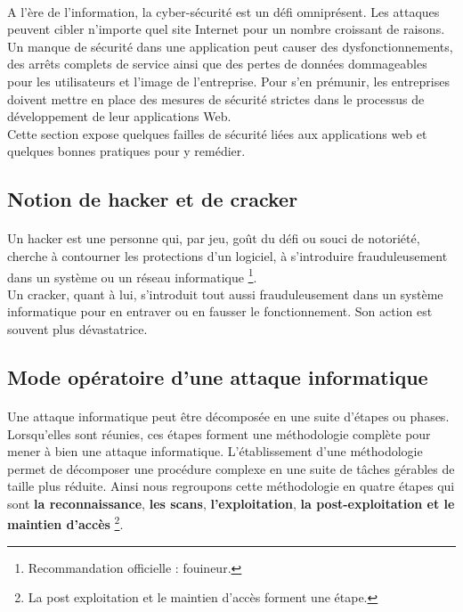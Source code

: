 \paragraph{}
	  A l'\`ere de l'information, la cyber-sécurité est un défi omniprésent. Les attaques peuvent cibler n'importe quel site Internet pour un nombre croissant de raisons. Un manque de sécurité dans une application peut causer des dysfonctionnements, des arrêts complets de service ainsi que des pertes de données dommageables pour les utilisateurs et l'image de l'entreprise. Pour s'en prémunir, les entreprises doivent mettre en place des mesures de sécurité strictes dans le processus de développement de leur applications Web. \\
	  Cette section expose quelques failles de s\'ecurit\'e li\'ees aux applications web et quelques bonnes pratiques pour y rem\'edier.
	  
	\subsection{Notion de hacker et de cracker}
	  \paragraph{}
	    Un hacker est une personne qui, par jeu, goût du défi ou souci de notoriété, cherche à contourner les protections d'un logiciel, à s'introduire frauduleusement dans un système ou un réseau informatique \cite{A} \footnote{Recommandation officielle : fouineur.}.\\Un cracker, quant à lui, s’introduit tout aussi frauduleusement dans un système informatique pour en entraver ou en fausser le fonctionnement. Son action est souvent plus dévastatrice.
		

	\subsection{Mode opératoire d'une attaque informatique}
	  \paragraph{}
	    Une attaque informatique peut être décomposée en une suite d’étapes ou phases. Lorsqu’elles sont réunies, ces étapes forment une méthodologie complète pour mener à bien une attaque informatique. L’établissement d’une méthodologie permet de décomposer une procédure complexe en une suite de tâches gérables de taille plus réduite. Ainsi nous regroupons cette méthodologie en quatre étapes qui sont \textbf{la reconnaissance}, \textbf{les scans}, \textbf{l'exploitation}, \textbf{la post-exploitation et le maintien d'accès} \footnote{La post exploitation et le maintien d'accès forment une étape.}\cite{c}.
	      
